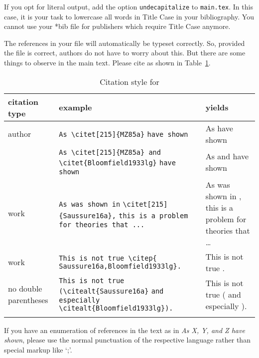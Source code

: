 {If you opt for literal output, add the option \verb+undecapitalize+ to \verb+main.tex+. In this case, it is your task to lowercase all words in Title Case in your bibliography. You cannot use your *bib file for publishers which require Title Case anymore. 

The references in your \bibtex file will automatically be typeset correctly. So, provided the
\bibtex file is correct, authors do not have to worry about this. But there are some things to
observe in the main text. Please cite as shown in Table~\ref{tab-citation}.

\begin{table}[bt] 
\caption{Citation style for \lsp}%
\label{tab-citation}
\begin{tabular}{p{1.2cm}>{\small}p{6.2cm}p{3.8cm}}
\lsptoprule
citation type & example &yields\\
\midrule
author & \raggedright \verb+As \citet[215]{MZ85a}+
	  \verb+have shown+             &As \citet[215]{MZ85a} have shown\\ 
       & \raggedright  \verb+As \citet[215]{MZ85a} and+
	  \verb+\citet{Bloomfield1933lg}+
	  \verb+have shown+ 
					  &  As \citet[215]{MZ85a} and \citet{Bloomfield1933lg} have shown\\ 
work   & \raggedright  \verb+As was shown in+ 
	  \verb+\citet[215]{Saussure16a},+
	  \verb+this is a problem for theories that ...+ & As was shown in \citet[215]{Saussure16a}, this is a problem for theories that \ldots\\ 
work   & \raggedright  \verb+This is not true \citep{+  
	  \verb+Saussure16a,Bloomfield1933lg}.+ & This is not true \citep{Saussure16a,Bloomfield1933lg}.\\[2em]
no double parentheses   & \raggedright \verb+This is not true+
			    \verb+(\citealt{Saussure16a}+
			    \verb+and especially+
			    \verb+\citealt{Bloomfield1933lg}).+& This is not true (\citealt{Saussure16a} and especially \citealt{Bloomfield1933lg}).\\
\lspbottomrule
\end{tabular}

\end{table}
\nocite{Bresnan82b}%
 
If you have an enumeration of references in the text as in \emph{As X, Y, and Z have shown}, please use
the normal punctuation of the respective language rather than special markup like `;'.


}

